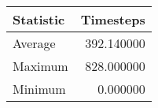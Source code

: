 \begin{tabular}{lr}
\toprule
Statistic & Timesteps \\
\midrule
Average & 392.140000 \\
Maximum & 828.000000 \\
Minimum & 0.000000 \\
\bottomrule
\end{tabular}
